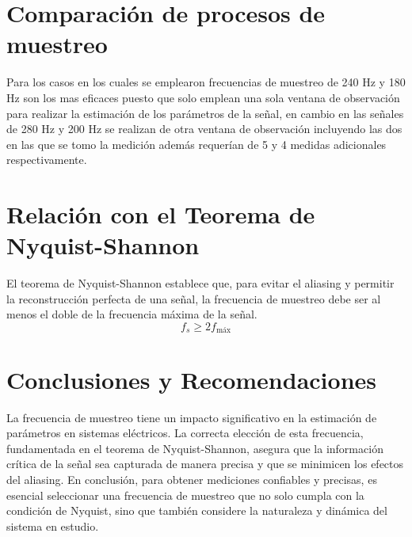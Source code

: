 \section{Comparación de procesos de muestreo}
    Para los casos en los cuales se emplearon frecuencias de muestreo de 240 Hz y 180 Hz son los mas eficaces puesto que solo emplean una sola ventana de observación para realizar la estimación de los parámetros de la señal, en cambio en las señales de 280 Hz y 200 Hz se realizan de otra ventana de observación incluyendo las dos en las que se tomo la medición además requerían de 5 y 4 medidas adicionales respectivamente.\\ 

\section{Relación con el Teorema de Nyquist-Shannon}
El teorema de Nyquist-Shannon establece que, para evitar el aliasing y permitir la reconstrucción perfecta de una señal, la frecuencia de muestreo debe ser al menos el doble de la frecuencia máxima de la señal.
\begin{equation}
    f_s \geq 2 f_{\text{máx}}
\end{equation}

\section{Conclusiones y Recomendaciones}
La frecuencia de muestreo tiene un impacto significativo en la estimación de parámetros en sistemas eléctricos. La correcta elección de esta frecuencia, fundamentada en el teorema de Nyquist-Shannon, asegura que la información crítica de la señal sea capturada de manera precisa y que se minimicen los efectos del aliasing. En conclusión, para obtener mediciones confiables y precisas, es esencial seleccionar una frecuencia de muestreo que no solo cumpla con la condición de Nyquist, sino que también considere la naturaleza y dinámica del sistema en estudio.

